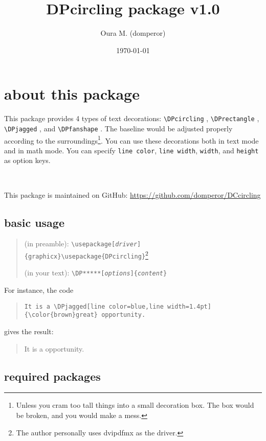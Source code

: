 \documentclass[10pt]{article}
\title{DPcircling package v1.0}
\author{Oura M. (domperor)}
\date{\today}
\begin{document}
\maketitle\thispagestyle{empty}

\section*{about this package}

This package provides 4 types of text decorations: \verb+\DPcircling+ , \verb+\DPrectangle+ , \verb+\DPjagged+ , and \verb+\DPfanshape+ . The baseline would be adjusted properly according to the surroundings\footnote{Unless you cram too tall things into a small decoration box. The box would be broken, and you would make a mess.}. You can use these decorations both in text mode and in math mode. You can specify \verb+line color+, \verb+line width+, \verb+width+, and \verb+height+ as option keys.

\ 

This package is maintained on GitHub: \url{https://github.com/domperor/DCcircling}

\subsection*{basic usage}

\begin{quote}
(in preamble): \verb+\usepackage[+\textit{\texttt{driver}}\verb+]{graphicx}\usepackage{DPcircling}+\footnote{The author personally uses dvipdfmx as the driver.}

(in your text): \verb+\DP*****[+\textit{\texttt{options}}\verb+]{+\textit{\texttt{content}}\verb+}+
\end{quote}

For instance, the code
\begin{quote}
\begin{verbatim}
It is a \DPjagged[line color=blue,line width=1.4pt]{\color{brown}great} opportunity.
\end{verbatim}
\end{quote}
\noindent gives the result:
\begin{quote}
It is a  opportunity.
\end{quote}

\subsection*{required packages}
\end{document}
